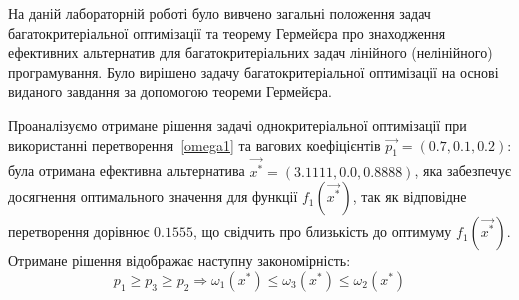 На даній лабораторній роботі було вивчено загальні положення задач багатокритеріальної оптимізації та теорему Гермейєра про знаходження ефективних альтернатив для багатокритеріальних задач лінійного (нелінійного) програмування. 
Було вирішено задачу багатокритеріальної оптимізації на основі виданого завдання за допомогою  теореми Гермейєра.

Проаналізуємо отримане рішення задачі однокритеріальної оптимізації при використанні перетворення~\eqref{omega1} та вагових коефіцієнтів $\vec{p_1} = (0.7, 0.1, 0.2)$:
була отримана ефективна альтернатива $\vec{x^*} = (3.1111,0.0,0.8888)$, яка забезпечує досягнення оптимального значення для  функції $f_1(\vec{x^*})$, так як відповідне перетворення дорівнює $0.1555$, що свідчить про близькість до оптимуму $f_1(\vec{x^*})$. Отримане рішення відображає наступну закономірність:
\[
p_1 \geq p_3 \geq p_2 \Longrightarrow \omega_1(x^*) \leq \omega_3(x^*) \leq \omega_2(x^*) 
\]


